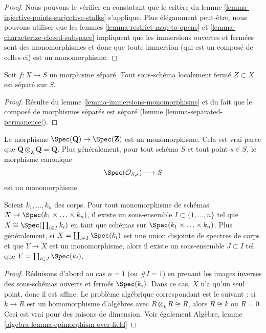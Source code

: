 \begin{proof}
Nous pouvons le vérifier en constatant que le critère du
lemme \ref{lemma-injective-points-surjective-stalks} s'applique. Plus
élégamment peut-être, nous pouvons utiliser que
les lemmes \ref{lemma-restrict-map-to-opens} et
\ref{lemma-characterize-closed-subspace} impliquent que les
immersions ouvertes et fermées sont des monomorphismes et donc que
toute immersion (qui est un composé de celles-ci)
est un monomorphisme.
\end{proof}

\begin{lemma}
\label{lemma-subscheme-of-separated-scheme}
Soit $f : X \to S$ un morphisme séparé. Tout
sous-schéma localement fermé $Z \subset X$ est séparé sur $S$.
\end{lemma}

\begin{proof}
Résulte du lemme \ref{lemma-immersions-monomorphisms}
et du fait que le composé de morphismes séparés est séparé
(lemme \ref{lemma-separated-permanence}).
\end{proof}

\begin{example}
\label{example-Q-over-Z}
Le morphisme $\Spec(\mathbf{Q}) \to \Spec(\mathbf{Z})$ est
un monomorphisme. Cela est vrai parce que
$\mathbf{Q} \otimes_{\mathbf{Z}} \mathbf{Q} = \mathbf{Q}$.
Plus généralement, pour tout schéma $S$ et tout point $s \in S$, le
morphisme canonique
$$
\Spec(\mathcal{O}_{S, s}) \longrightarrow S
$$
est un monomorphisme.
\end{example}

\begin{lemma}
\label{lemma-mono-towards-spec-field}
Soient $k_1, \ldots, k_n$ des corps.
Pour tout monomorphisme de schémas
$X \to \Spec(k_1 \times \ldots \times k_n)$,
il existe un sous-ensemble $I \subset \{1, \ldots, n\}$ tel
que $X \cong \Spec(\prod_{i \in I} k_i)$ en tant
que schémas sur $\Spec(k_1 \times \ldots \times k_n)$.
Plus généralement, si $X = \coprod_{i \in I} \Spec(k_i)$ est
une union disjointe de spectres de corps et que $Y \to X$ est un monomorphisme,
alors il existe un sous-ensemble $J \subset I$ tel
que $Y = \coprod_{i \in J} \Spec(k_i)$.
\end{lemma}

\begin{proof}
Réduisons d'abord au cas $n = 1$ (ou $\# I = 1$) en
prenant les images inverses des sous-schémas
ouverts et fermés $\Spec(k_i)$. Dans ce cas,
$X$ n'a qu'un seul point, donc il est affine. Le problème
algébrique correspondant est le suivant : si $k
\to R$ est un homomorphisme d'algèbres
avec $R \otimes_k R \cong R$, alors $R \cong k$ ou $R = 0$. Ceci
est vrai pour des raisons de dimension.
Voir
également Algèbre, lemme \ref{algebra-lemma-epimorphism-over-field}
\end{proof}










